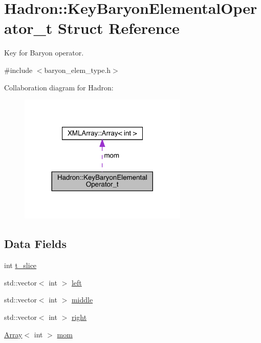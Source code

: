 \hypertarget{structHadron_1_1KeyBaryonElementalOperator__t}{}\section{Hadron\+:\+:Key\+Baryon\+Elemental\+Operator\+\_\+t Struct Reference}
\label{structHadron_1_1KeyBaryonElementalOperator__t}


Key for Baryon operator.  




{\ttfamily \#include $<$baryon\+\_\+elem\+\_\+type.\+h$>$}



Collaboration diagram for Hadron\+:\nopagebreak
\begin{figure}[H]
\begin{center}
\leavevmode
\includegraphics[width=228pt]{d0/d94/structHadron_1_1KeyBaryonElementalOperator__t__coll__graph}
\end{center}
\end{figure}
\subsection*{Data Fields}
\begin{DoxyCompactItemize}
\item 
int \mbox{\hyperlink{structHadron_1_1KeyBaryonElementalOperator__t_a5f9b88389c2511c843a8195a7846a558}{t\+\_\+slice}}
\item 
std\+::vector$<$ int $>$ \mbox{\hyperlink{structHadron_1_1KeyBaryonElementalOperator__t_af96ec30bec000253ef08d77c33ee0260}{left}}
\item 
std\+::vector$<$ int $>$ \mbox{\hyperlink{structHadron_1_1KeyBaryonElementalOperator__t_a310e6846a61126f369c0171fc4b42432}{middle}}
\item 
std\+::vector$<$ int $>$ \mbox{\hyperlink{structHadron_1_1KeyBaryonElementalOperator__t_ac05464b673873344a6ccf42673bf0c1b}{right}}
\item 
\mbox{\hyperlink{classXMLArray_1_1Array}{Array}}$<$ int $>$ \mbox{\hyperlink{structHadron_1_1KeyBaryonElementalOperator__t_aba1d334d9b368ada45bf4630a3088297}{mom}}
\end{DoxyCompactItemize}


